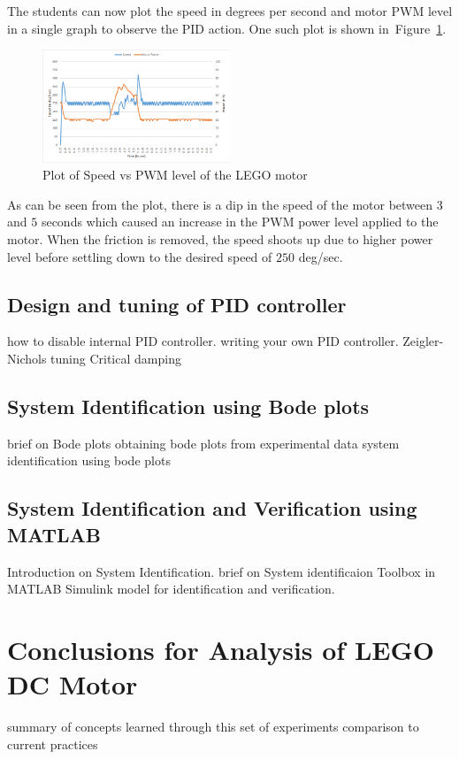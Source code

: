 \documentclass[paper=a4, fontsize=11pt]{scrartcl}
\numberwithin{equation}{section}        %
\numberwithin{figure}{section}          %
\numberwithin{table}{section}           %
\begin{document}
The students can now plot the speed in degrees per second and motor PWM level in a single graph to observe the PID action. One such plot is shown in~Figure~\ref{fig:PIDplot}.

\begin{figure}[!hbp]
	\includegraphics[width=0.5\textwidth]{PIDplot}
	\caption{Plot of Speed vs PWM level of the LEGO motor}
	\label{fig:PIDplot}
\end{figure}

As can be seen from the plot, there is a dip in the speed of the motor between $3$ and $5$ seconds which caused an increase in the PWM power level applied to the motor. When the friction is removed, the speed shoots up due to higher power level before settling down to the desired speed of $250$ deg/sec.

\subsection{Design and tuning of PID controller}
how to disable internal PID controller.
writing your own PID controller.
Zeigler-Nichols tuning
Critical damping

\subsection{System Identification using Bode plots}
brief on Bode plots
obtaining bode plots from experimental data
system identification using bode plots

\subsection{System Identification and Verification using MATLAB}
Introduction on System Identification.
brief on System identificaion Toolbox in MATLAB
Simulink model for identification and verification.

\section{Conclusions for Analysis of LEGO DC Motor}
summary of concepts learned through this set of experiments
comparison to current practices
\end{document}
